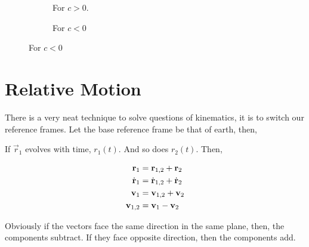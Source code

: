 \begin{figure}[H]
    \centering
    \begin{subfigure}{0.5\textwidth}
        \centering
        \caption{For \(c > 0\). }
    \end{subfigure}%
    \begin{subfigure}{0.5\textwidth}
        \centering
        \caption{For \(c < 0\)}
    \end{subfigure}%
\end{figure}

\section{Relative Motion}

There is a very neat technique to solve questions of kinematics, it is to switch our 
reference frames. Let the base reference frame be that of earth, then,

\begin{figure}
    [H]
    \centering
\end{figure}

If \(\vec{r}_1\) evolves with time, \(r_1(t)\). And so does \(r_2(t)\). Then,

\begin{align*}
    \boldsymbol{\mathbf{r}}_1 &= \boldsymbol{\mathbf{r}}_{1,2} + \boldsymbol{\mathbf{r}}_2 \\
    \dot{\boldsymbol{\mathbf{r}}}_1 &= \dot{\boldsymbol{\mathbf{r}}}_{1,2} + \dot{\boldsymbol{\mathbf{r}}}_2 \\
    \boldsymbol{\mathbf{v}}_1 &= \boldsymbol{\mathbf{v}}_{1,2} + \boldsymbol{\mathbf{v}}_{2}\\
    \boldsymbol{\mathbf{v}}_{1,2} &= \boldsymbol{\mathbf{v}}_1 - \boldsymbol{\mathbf{v}}_{2}
\end{align*}

Obviously if the vectors face the same direction in the same plane, then, the components subtract. If they face
opposite direction, then the components add. 

